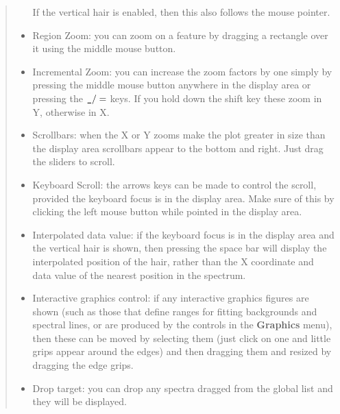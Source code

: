 \documentclass[twoside,11pt]{article}
\renewcommand{\_}{\texttt{\symbol{95}}}
\newcommand{\menuitem}[1]{\textbf{#1}}
\begin{document}
\begin{quote}
\begin{itemize}
  If the vertical hair is enabled, then this also follows the mouse
  pointer.

  \item Region Zoom: you can zoom on a feature by dragging a rectangle
  over it using the middle mouse button.

  \item Incremental Zoom: you can increase the zoom factors by one
  simply by pressing the middle mouse button anywhere in the display
  area or pressing the $\_/=$ keys. If you hold down the shift key
  these zoom in Y, otherwise in X.

  \item Scrollbars: when the X or Y zooms make the plot greater in size
  than the display area scrollbars appear to the bottom and right. Just
  drag the sliders to scroll.

  \item Keyboard Scroll: the arrows keys can be made to control the
  scroll, provided the keyboard focus is in the display area. Make sure
  of this by clicking the left mouse button while pointed in the display
  area.

  \item Interpolated data value: if the keyboard focus is in the
  display area and the vertical hair is shown, then pressing the space
  bar will display the interpolated position of the hair, rather than
  the X coordinate and data value of the nearest position in the
  spectrum.

  \item Interactive graphics control: if any interactive graphics figures are
  shown (such as those that define ranges for fitting backgrounds and spectral
  lines, or are produced by the controls in the \menuitem{Graphics} menu),
  then these can be moved by selecting them (just click on one and little
  grips appear around the edges) and then dragging them and resized by
  dragging the edge grips.

  \item Drop target: you can drop any spectra dragged from the global
  list and they will be displayed.

 \end{itemize}
\end{quote}
\end{document}
